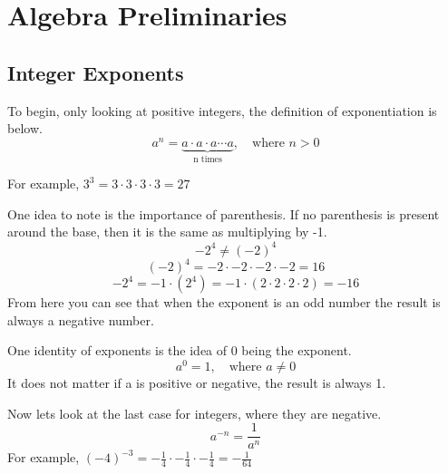 \documentclass[12pt, letterpaper, oneside]{book}
\begin{document}
\chapter{Algebra Preliminaries}
\section{Integer Exponents}
To begin, only looking at positive integers, the definition of exponentiation is below.
\begin{equation}
    a^n = \underbrace{ a \cdot a \cdot  a\cdots a}_\textrm{n times}, \quad \text{where } n > 0
\end{equation}

For example, $ 3^3 = 3 \cdot 3 \cdot 3 \cdot 3 = 27 $

One idea to note is the importance of parenthesis. If no parenthesis is present around the base, then it is the same as multiplying by -1.
\[-2^4 \neq (-2)^4 \]
\[(-2)^4 = -2 \cdot -2 \cdot -2 \cdot -2 = 16\] 
\[-2^4 = -1 \cdot (2^4) = -1 \cdot (2 \cdot 2 \cdot 2 \cdot 2) = -16\]
From here you can see that when the exponent is an odd number the result is always a negative number.

One identity of exponents is the idea of 0 being the exponent.
\begin{equation}
    a^0 = 1, \quad \text{where } a \neq 0
\end{equation}
It does not matter if a is positive or negative, the result is always 1.

Now lets look at the last case for integers, where they are negative.
\begin{equation}
    a^{-n} = \frac{1}{a^n}
\end{equation}
For example, $(-4)^{-3} = -\frac{1}{4} \cdot -\frac{1}{4} \cdot -\frac{1}{4} = -\frac{1}{64}$
\end{document}
